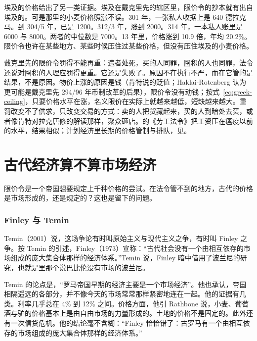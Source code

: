 埃及的价格给出了另一类证据。埃及在戴克里先的辖区里，限价令的抄本就有出自埃及的。可是那里的小麦价格照涨不误。301 年，一张私人收据上是 640 德拉克马。到 304/5 年，已是 1200。312/3 年，涨到 2000。314 年，一本私人账里是 6000 与 8000。两者的中位数是 7000\cite{kelly2021}。13 年里，价格涨到 10.9 倍，年均 20.2\%。限价令也许在某些地方、某些时候压住过某些价格，但没有压住埃及的小麦价格。

\begin{pitfall}
戴克里先的限价令罚得不能再重：违者处死，买的人同罪，囤积的人也同罪，法令还说对囤积的人理应罚得更重。它还是失败了。原因不在执行不严，而在它管的是结果，不是原因。物价上涨的原因是钱（肯特说的贬值；Haklai-Rotenberg 认为更可能是戴克里先 294/96 年币制改革的后果），限价令没有动钱；按式~\eqref{eq:greek-ceiling}，只要价格水平在涨，名义限价在实际上就越来越低，短缺越来越大。重罚改变不了供求，只改变交易的方式：卖的人把货藏起来，买的人到暗处去买，或者像肯特对拉克唐修的解读那样，聚众砸店。的《劳工法令》把工资压在瘟疫以前的水平，结果相似；计划经济里长期的价格管制与排队，见。
\end{pitfall}

\section{古代经济算不算市场经济}\label{sec:greek-debate}

限价令是一个帝国想要规定上千种价格的尝试。在法令管不到的地方，古代的价格是市场形成的，还是规定的？这也是留下的问题。

\subsubsection{Finley 与 Temin}
Temin（2001）说，这场争论有时叫原始主义与现代主义之争，有时叫 Finley 之争。按 Temin 的引述，Finley（1973）\cite{finley1973}宣称：“古代社会没有一个由相互依存的市场组成的庞大集合体那样的经济体系。”Temin 说，Finley 暗中借用了波兰尼的研究\cite{temin2001}，也就是里那个说巴比伦没有市场的波兰尼。

Temin 的论点是，“罗马帝国早期的经济主要是一个市场经济”。他也承认，帝国相隔遥远的各部分，并不像今天的市场常常那样紧密地连在一起\cite{temin2001}。他的证据有几类。利率几乎总在 4\% 到 12\% 之间。价格方面，他引 Rathbone 说，小麦、葡萄酒与驴的价格基本上是由自由市场的力量形成的。土地的价格不是固定的。此外还有一次信贷危机。他的结论毫不含糊：“Finley 恰恰错了：古罗马有一个由相互依存的市场组成的庞大集合体那样的经济体系。”\cite{temin2001}

